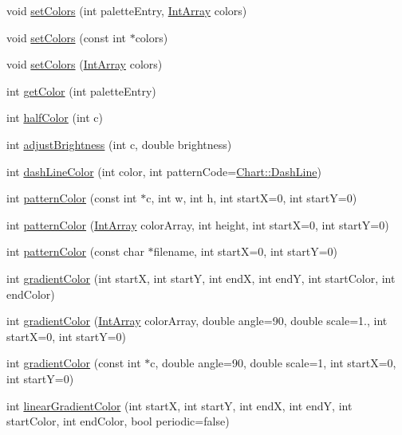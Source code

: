 \begin{DoxyCompactItemize}
\item 
void \hyperlink{class_base_chart_a97a8d359493d86900dd2dd577b65c593}{set\+Colors} (int palette\+Entry, \hyperlink{class_int_array}{Int\+Array} colors)
\item 
void \hyperlink{class_base_chart_a723ac51f36ac8d8ed451a24665935229}{set\+Colors} (const int $\ast$colors)
\item 
void \hyperlink{class_base_chart_a9f8769cbd1e4c964d154303765d2bd8e}{set\+Colors} (\hyperlink{class_int_array}{Int\+Array} colors)
\item 
int \hyperlink{class_base_chart_a43e7e8f3ea4d05ec9976ee59ba9bd10e}{get\+Color} (int palette\+Entry)
\item 
int \hyperlink{class_base_chart_a206a27f68bab2ada4a2f6fb4fe0e1195}{half\+Color} (int c)
\item 
int \hyperlink{class_base_chart_a8d0537753ea2dab3dacc9ae7f9c4d356}{adjust\+Brightness} (int c, double brightness)
\item 
int \hyperlink{class_base_chart_af13e897adc780569cd048d997f7c59c6}{dash\+Line\+Color} (int color, int pattern\+Code=\hyperlink{namespace_chart_a5ae3d159f02ffed01fcc4e63793dea7da11e22a06cf50415c9f8c799ce6ecd671}{Chart\+::\+Dash\+Line})
\item 
int \hyperlink{class_base_chart_a509ee8041116d1a149494d1ca286f945}{pattern\+Color} (const int $\ast$c, int w, int h, int startX=0, int startY=0)
\item 
int \hyperlink{class_base_chart_a6b6bea43b51896c82d83778a614f5d99}{pattern\+Color} (\hyperlink{class_int_array}{Int\+Array} color\+Array, int height, int startX=0, int startY=0)
\item 
int \hyperlink{class_base_chart_a5938beff89dc799bdfd12663caa65aff}{pattern\+Color} (const char $\ast$filename, int startX=0, int startY=0)
\item 
int \hyperlink{class_base_chart_a08b315e98f520c49fbe393738a978f00}{gradient\+Color} (int startX, int startY, int endX, int endY, int start\+Color, int end\+Color)
\item 
int \hyperlink{class_base_chart_a645f49a14197731a2e96e02c8df1f468}{gradient\+Color} (\hyperlink{class_int_array}{Int\+Array} color\+Array, double angle=90, double scale=1., int startX=0, int startY=0)
\item 
int \hyperlink{class_base_chart_afccfb0b504a015434d0e8504d683f0b5}{gradient\+Color} (const int $\ast$c, double angle=90, double scale=1, int startX=0, int startY=0)
\item 
int \hyperlink{class_base_chart_af58f13bbae3eb6f0ac2669ceaa4ae935}{linear\+Gradient\+Color} (int startX, int startY, int endX, int endY, int start\+Color, int end\+Color, bool periodic=false)

\end{DoxyCompactItemize}
